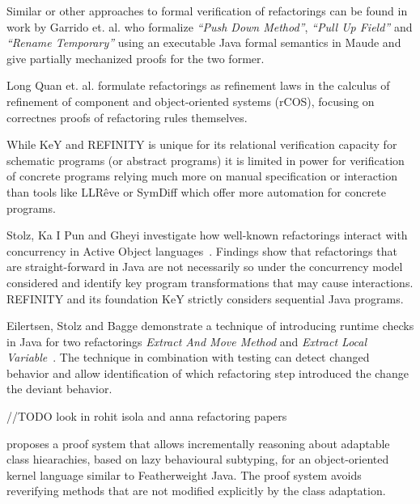 Similar or other approaches to formal verification of refactorings can be found in work by
Garrido et. al. \cite{garrido2006formal} who formalize \emph{``Push Down Method''},
\emph{``Pull Up Field''} and \emph{``Rename Temporary''} using an executable
Java formal semantics in Maude and give partially mechanized proofs for the two former.

Long Quan et. al. \cite{DBLP:conf/isola/QuanQL08} formulate refactorings as refinement
laws in the calculus of refinement of component and object-oriented systems (rCOS),
focusing on correctnes proofs of refactoring rules themselves.

While KeY and REFINITY is unique for its relational verification capacity for
schematic programs (or abstract programs) it is limited in power for verification
of concrete programs relying much more on manual specification or interaction \cite{DBLP:conf/aplas/Steinhofel20}
than tools like LLRêve \cite{DBLP:journals/jar/KieferKU18} or SymDiff \cite{DBLP:conf/cav/LahiriHKR12}
which offer more automation for concrete programs.


Stolz, Ka I Pun and Gheyi investigate how well-known refactorings interact with concurrency in Active Object languages~\cite{DBLP:conf/isola/StolzPG20}.
Findings show that refactorings that are straight-forward in Java are not necessarily so under the concurrency model considered and identify key
program transformations that may cause interactions.
REFINITY and its foundation KeY strictly considers sequential Java programs.

Eilertsen, Stolz and Bagge demonstrate a technique of introducing runtime checks in Java for two refactorings \emph{Extract And Move Method} and
\emph{Extract Local Variable}~\cite{stolz:isolarefa}. The technique in combination with testing can detect changed behavior and allow identification
of which refactoring step introduced the change the deviant behavior.



//TODO look in rohit isola and anna refactoring papers

\cite{dovland:adaptableclass2015} proposes a proof system that allows
incrementally reasoning about adaptable class hiearachies, based on
lazy behavioural subtyping, for 
an object-oriented kernel language similar to Featherweight Java.  The
proof system avoids reverifying methods that are not modified
explicitly by the class adaptation.




